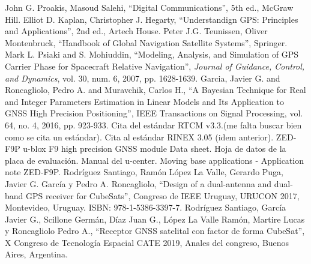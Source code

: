 \documentclass[a4paper,12pt,oneside,onecolumn,final,openright]{book}%
\begin{document}
\begin{thebibliography}{00}
 John G. Proakis, Masoud Salehi, ``Digital Communications'', 5th ed., McGraw Hill.
 Elliot D. Kaplan, Christopher J. Hegarty, ``Understandign GPS: Principles and Applications'', 2nd ed., Artech House.
 Peter J.G. Teunissen, Oliver Montenbruck, ``Handbook of Global Navigation Satellite Systems'', Springer.
 Mark L. Psiaki and S. Mohiuddin, ``Modeling, Analysis, and Simulation of GPS Carrier Phase for Spacecraft Relative Navigation'', \textit{Journal of Guidance, Control, and Dynamics}, vol. 30, num. 6, 2007, pp. 1628-1639.
 Garcia, Javier G. and Roncagliolo, Pedro A. and Muravchik, Carlos H., ``A Bayesian Technique for Real and Integer Parameters Estimation in Linear Models and Its Application to GNSS High Precision Positioning'', IEEE Transactions on Signal Processing, vol. 64, no. 4, 2016, pp. 923-933.
 Cita del estándar RTCM v3.3.(me falta buscar bien como se cita un estándar).
 Cita al estándar RINEX 3.05 (idem anterior).
 ZED-F9P u-blox F9 high precision GNSS module Data sheet.
 Hoja de datos de la placa de evaluación.
 Manual del u-center.
 Moving base applications - Application note ZED-F9P.
 Rodríguez Santiago, Ramón López La Valle, Gerardo Puga, Javier G. García y Pedro A. Roncagliolo, ``Design of a dual-antenna and dual-band GPS receiver for CubeSats'', Congreso de IEEE Uruguay, URUCON 2017, Montevideo, Uruguay. ISBN: 978-1-5386-3397-7.
 Rodríguez Santiago, García Javier G., Scillone Germán, Díaz Juan G., López La Valle Ramón, Martire Lucas y Roncagliolo Pedro A., ``Receptor GNSS satelital con factor de forma CubeSat'', X Congreso de Tecnología Espacial CATE 2019, Anales del congreso, Buenos Aires, Argentina.

\end{thebibliography}
\end{document}
